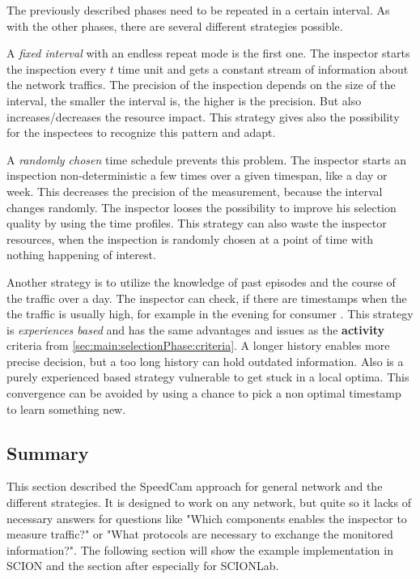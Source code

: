 \documentclass[thesis.tex]{subfiles}
\begin{document}
The previously described phases need to be repeated in a certain interval. As with the other phases, there are several different strategies possible.

A \textit{fixed interval} with an endless repeat mode is the first one. The inspector starts the inspection every $t$ time unit and gets a constant stream of information about the network traffics. The precision of the inspection depends on the size of the interval, the smaller the interval is, the higher is the precision. But also increases/decreases the resource impact. This strategy gives also the possibility for the inspectees to recognize this pattern and adapt.

A \textit{randomly chosen} time schedule prevents this problem. The inspector starts an inspection non-deterministic a few times over a given timespan, like a day or week. This decreases the precision of the measurement, because the interval changes randomly. The inspector looses the possibility to improve his selection quality by using the time profiles. This strategy can also waste the inspector resources, when the inspection is randomly chosen at a point of time with nothing happening of interest.

Another strategy is to utilize the knowledge of past episodes and the course of the traffic over a day. The inspector can check, if there are timestamps when the the traffic is usually high, for example in the evening for consumer . This strategy is \textit{experiences based} and has the same advantages and issues as the \textbf{activity} criteria from \autoref{sec:main:selectionPhase:criteria}. A longer history enables more precise decision, but a too long history can hold outdated information. Also is a purely experienced based strategy vulnerable to get stuck in a local optima. This convergence can be avoided by using a chance to pick a non optimal timestamp to learn something new.

\subsection{Summary}
This section described the SpeedCam approach for general network and the different strategies. It is designed to work on any network, but quite so it lacks of necessary answers for questions like "Which components enables the inspector to measure traffic?" or "What protocols are necessary to exchange the monitored information?". The following section will show the example implementation in SCION and the section after especially for SCIONLab.
\end{document}
